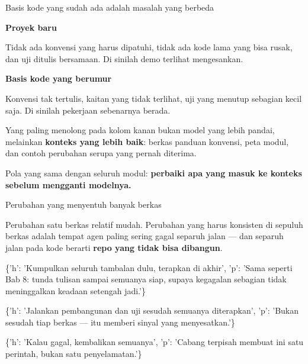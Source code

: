 \documentclass[aspectratio=169,11pt,t]{beamer}
\begin{document}
\begin{frame}[shrink=25]{Basis kode yang sudah ada adalah masalah yang berbeda}
\begin{minipage}[t]{0.485\textwidth}
{\fontsize{9.4}{12.6}\selectfont\color{fg2}\textbf{Proyek baru}\par}\vskip 4pt
{\fontsize{9.4}{12.6}\selectfont\color{fg2}Tidak ada konvensi yang harus dipatuhi, tidak ada kode lama yang bisa rusak, dan uji ditulis bersamaan. Di sinilah demo terlihat mengesankan.\par}\vskip 4pt

\end{minipage}%
\hfill
\begin{minipage}[t]{0.485\textwidth}
{\fontsize{9.4}{12.6}\selectfont\color{fg2}\textbf{Basis kode yang berumur}\par}\vskip 4pt
{\fontsize{9.4}{12.6}\selectfont\color{fg2}Konvensi tak tertulis, kaitan yang tidak terlihat, uji yang menutup sebagian kecil saja. Di sinilah pekerjaan sebenarnya berada.\par}\vskip 4pt

\end{minipage}%
{\fontsize{9.4}{12.6}\selectfont\color{fg2}Yang paling menolong pada kolom kanan bukan model yang lebih pandai, melainkan \textbf{konteks yang lebih baik}: berkas panduan konvensi, peta modul, dan contoh perubahan serupa yang pernah diterima.\par}\vskip 4pt
\begin{iband}[signal]
Pola yang sama dengan seluruh modul: \textbf{perbaiki apa yang masuk ke konteks sebelum mengganti modelnya.}
\end{iband}
\end{frame}

\begin{frame}[shrink=25]{Perubahan yang menyentuh banyak berkas}
{\fontsize{9.4}{12.6}\selectfont\color{fg2}Perubahan satu berkas relatif mudah. Perubahan yang harus konsisten di sepuluh berkas adalah tempat agen paling sering gagal separuh jalan --- dan separuh jalan pada kode berarti \textbf{repo yang tidak bisa dibangun}.\par}\vskip 4pt
\begin{isteps}
\item \{'h': 'Kumpulkan seluruh tambalan dulu, terapkan di akhir', 'p': 'Sama seperti Bab 8: tunda tulisan sampai semuanya siap, supaya kegagalan sebagian tidak meninggalkan keadaan setengah jadi.'\}
\item \{'h': 'Jalankan pembangunan dan uji sesudah semuanya diterapkan', 'p': 'Bukan sesudah tiap berkas --- itu memberi sinyal yang menyesatkan.'\}
\item \{'h': 'Kalau gagal, kembalikan semuanya', 'p': 'Cabang terpisah membuat ini satu perintah, bukan satu penyelamatan.'\}
\end{isteps}
\end{frame}
\end{document}
